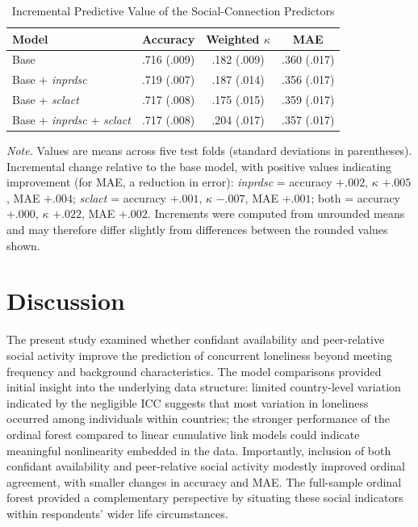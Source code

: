 \documentclass[12pt]{article}
\newcommand{\code}[1]{\textit{#1}}
\begin{document}
\begin{table}[H]
  \footnotesize
  \caption{Incremental Predictive Value of the Social-Connection Predictors}
  \label{tab:ipv}
  \begin{tabular}{lccc}
    \toprule
    Model & Accuracy & Weighted $\kappa$ & MAE \\
    \midrule
    Base & .716 (.009) & .182 (.009) & .360 (.017) \\
    Base + \code{inprdsc} & .719 (.007) & .187 (.014) & .356 (.017) \\
    Base + \code{sclact} & .717 (.008) & .175 (.015) & .359 (.017) \\
    Base + \code{inprdsc} + \code{sclact} & .717 (.008) & .204 (.017) & .357 (.017) \\
    \bottomrule
  \end{tabular}

  \vspace{6pt}

  \raggedright
  \textit{Note.} Values are means across five test folds (standard deviations in
  parentheses). Incremental change relative to the base model, with positive values
  indicating improvement (for MAE, a reduction in error): \code{inprdsc} = accuracy $+.002$,
  $\kappa$ $+.005$, MAE $+.004$; \code{sclact} = accuracy $+.001$, $\kappa$ $-.007$, MAE
  $+.001$; both = accuracy $+.000$, $\kappa$ $+.022$, MAE $+.002$. Increments were computed
  from unrounded means and may therefore differ slightly from differences between the rounded
  values shown.
\end{table}

\section{Discussion}

The present study examined whether confidant availability and peer-relative social
activity improve the prediction of concurrent loneliness beyond meeting frequency and
background characteristics. The model comparisons provided initial insight into the
underlying data structure: limited country-level variation indicated by the negligible
ICC suggests that most variation in loneliness occurred among individuals within
countries; the stronger performance of the ordinal forest compared to linear cumulative
link models could indicate meaningful nonlinearity embedded in the data. Importantly,
inclusion of both confidant availability and peer-relative social activity modestly
improved ordinal agreement, with smaller changes in accuracy and MAE. The full-sample
ordinal forest provided a complementary perspective by situating these social indicators
within respondents' wider life circumstances.
\end{document}
